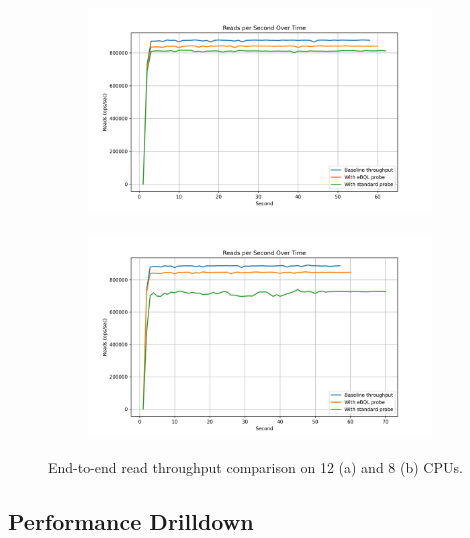 \begin{figure}
    \centering
    \begin{subfigure}{.5\textwidth}
        \centering
        \includegraphics[width=\linewidth]{diagrams/baseline-eval-throughput-12.png}
        \caption{}
        \label{fig:sub1}
    \end{subfigure}%
    \begin{subfigure}{.5\textwidth}
        \centering
        \includegraphics[width=\linewidth]{diagrams/baseline-eval-throughput-8.png}
        \caption{}
    \end{subfigure}
    \caption{End-to-end read throughput comparison on 12 (a) and 8 (b) CPUs.}
    \label{fig:baseline-eval-throughput}
\end{figure}

\subsection{Performance Drilldown}
\label{perf-drilldown}

